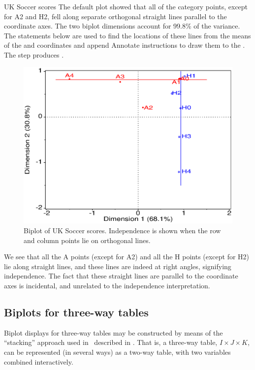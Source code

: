 \begin{Example}[soccer3]{UK Soccer scores}
The default plot showed that all of the category points, except for A2 and H2, fell along
separate orthogonal straight lines parallel to the coordinate axes.
The two biplot dimensions account for 99.8\% of the variance.
The statements below are used to find the locations of these lines
from the means of the  and  coordinates
and append Annotate instructions to draw them to the  \ADS.
The  step produces .
\begin{figure}[htb]
  \centering
  \includegraphics[scale=.6]{ch5/fig/soccer3}
  \caption[Biplot of UK Soccer scores]{Biplot of UK Soccer scores.
  Independence is shown when the row and column points lie on orthogonal
  lines.}  \label{fig:soccer3}
\end{figure}

We see that all the A points (except for A2) and all the H points (except for H2) lie along straight lines, and these lines are indeed at right angles,
signifying independence.
The fact that these straight lines are parallel to the coordinate axes is
incidental, and unrelated to the independence interpretation.
\end{Example}

\subsection{Biplots for three-way tables}
Biplot displays for three-way tables may be constructed by means of the
``stacking'' approach used in \CA\ described in .
That is, a
three-way table,  \(I \times  J \times  K\),
can be represented (in several ways) as a two-way table, with two
variables combined interactively.


